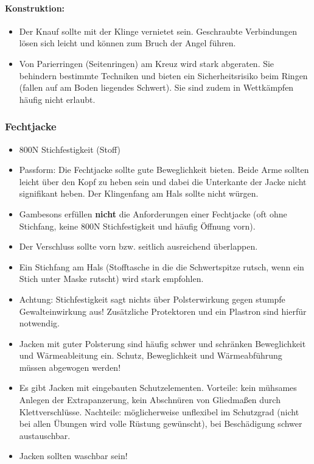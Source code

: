 \paragraph{Konstruktion:}
\begin{itemize}
    \item Der Knauf sollte mit der Klinge vernietet sein.
        Geschraubte Verbindungen lösen sich leicht und können zum Bruch der Angel führen.
    \item Von Parierringen (Seitenringen) am Kreuz wird stark abgeraten.
        Sie behindern bestimmte Techniken und bieten ein Sicherheitsrisiko beim Ringen (fallen auf am Boden liegendes Schwert).
        Sie sind zudem in Wettkämpfen häufig nicht erlaubt.
\end{itemize}

\newpage

\subsubsection*{Fechtjacke}

\begin{itemize}
    \item 800N Stichfestigkeit (Stoff)
    \item Passform: Die Fechtjacke sollte gute Beweglichkeit bieten.
        Beide Arme sollten leicht über den Kopf zu heben sein und dabei die Unterkante der Jacke nicht signifikant heben.
        Der Klingenfang am Hals sollte nicht würgen.
    \item Gambesons erfüllen \textbf{nicht} die Anforderungen einer Fechtjacke (oft ohne Stichfang, keine 800N Stichfestigkeit und häufig Öffnung vorn).
    \item Der Verschluss sollte vorn bzw. seitlich ausreichend überlappen.
    \item Ein Stichfang am Hals (Stofftasche in die die Schwertspitze rutsch, wenn ein Stich unter Maske rutscht) wird stark empfohlen.
    \item Achtung: Stichfestigkeit sagt nichts über Polsterwirkung gegen stumpfe Gewalteinwirkung aus!
        Zusätzliche Protektoren und ein Plastron sind hierfür notwendig.
    \item Jacken mit guter Polsterung sind häufig schwer und schränken Beweglichkeit und Wärmeableitung ein.
        Schutz, Beweglichkeit und Wärmeabführung müssen abgewogen werden!
    \item Es gibt Jacken mit eingebauten Schutzelementen.
        Vorteile: kein mühsames Anlegen der Extrapanzerung, kein Abschnüren von Gliedmaßen durch Klettverschlüsse.
        Nachteile: möglicherweise unflexibel im Schutzgrad (nicht bei allen Übungen wird volle Rüstung gewünscht), bei Beschädigung schwer austauschbar.
    \item Jacken sollten waschbar sein!
\end{itemize}

